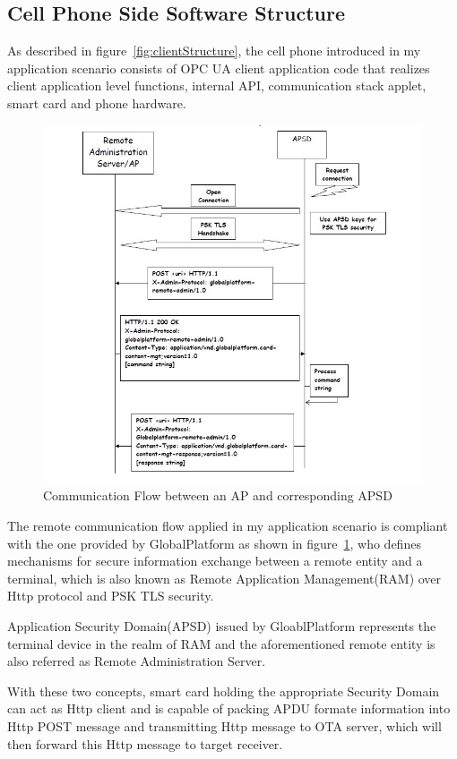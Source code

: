 \subsection{Cell Phone Side Software Structure}
As described in figure~\ref{fig:clientStructure}, the cell phone introduced in my application scenario consists of OPC UA client application code that realizes client application level functions, internal API, communication stack applet, smart card and phone hardware.

\begin{figure}[!htbp]
	\centering
	\includegraphics[width=1.2\textwidth]{apsd.jpg}
		\caption{Communication Flow between an AP and corresponding APSD\cite{ramGP}}
	\label{fig:apsd}
\end{figure}
The remote communication flow applied in my application scenario is compliant with the one provided by GlobalPlatform as shown in figure~\ref{fig:apsd}, who defines mechanisms for secure information exchange between a remote entity and a terminal, which is also known as Remote Application Management(RAM) over Http protocol and PSK TLS security. 

Application Security Domain(APSD) issued by GloablPlatform represents the terminal device in the realm of RAM and the aforementioned remote entity  is also referred as Remote Administration Server. 

With these two concepts, smart card holding the appropriate Security Domain can act as Http client and is capable of packing APDU formate information into Http POST message and transmitting Http message to OTA server, which will then forward this Http message to target receiver.\cite{ramGP}
 
